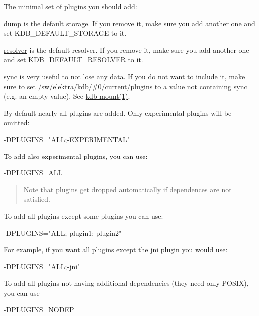 The minimal set of plugins you should add\+:
\begin{DoxyItemize}
\item \hyperlink{md_src_plugins_dump_README_src_plugins_dump_README_md}{dump} is the default storage. If you remove it, make sure you add another one and set {\ttfamily K\+D\+B\+\_\+\+D\+E\+F\+A\+U\+L\+T\+\_\+\+S\+T\+O\+R\+A\+GE} to it.
\item \hyperlink{md_src_plugins_resolver_README_src_plugins_resolver_README_md}{resolver} is the default resolver. If you remove it, make sure you add another one and set {\ttfamily K\+D\+B\+\_\+\+D\+E\+F\+A\+U\+L\+T\+\_\+\+R\+E\+S\+O\+L\+V\+ER} to it.
\item \hyperlink{md_src_plugins_sync_README_src_plugins_sync_README_md}{sync} is very useful to not lose any data. If you do not want to include it, make sure to set {\ttfamily /sw/elektra/kdb/\#0/current/plugins} to a value not containing sync (e.\+g. an empty value). See \hyperlink{md_doc_help_kdb-mount_doc_help_kdb-mount_md}{kdb-\/mount(1)}.
\end{DoxyItemize}

By default nearly all plugins are added. Only experimental plugins will be omitted\+: \begin{DoxyVerb}-DPLUGINS="ALL;-EXPERIMENTAL"
\end{DoxyVerb}


To add also experimental plugins, you can use\+: \begin{DoxyVerb}-DPLUGINS=ALL
\end{DoxyVerb}


\begin{quote}
Note that plugins get dropped automatically if dependences are not satisfied. \end{quote}


To add all plugins except some plugins you can use\+: \begin{DoxyVerb}-DPLUGINS="ALL;-plugin1;-plugin2"
\end{DoxyVerb}


For example, if you want all plugins except the jni plugin you would use\+: \begin{DoxyVerb}-DPLUGINS="ALL;-jni"
\end{DoxyVerb}


To add all plugins not having additional dependencies (they need only P\+O\+S\+IX), you can use \begin{DoxyVerb}-DPLUGINS=NODEP
\end{DoxyVerb}


